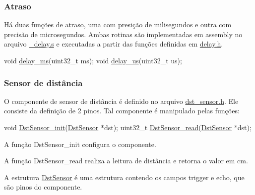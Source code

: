 \subsubsection*{Atraso}

Há duas funções de atraso, uma com presição de milisegundos e outra com precisão de microsegundos. Ambas rotinas são implementadas em assembly no arquivo {\ttfamily \mbox{\hyperlink{__delay_8s}{\+\_\+delay.\+s}}} e executadas a partir das funções definidas em {\ttfamily \mbox{\hyperlink{delay_8h}{delay.\+h}}}.


\begin{DoxyCode}
\textcolor{keywordtype}{void} \mbox{\hyperlink{delay_8c_ab7cce8122024d7ba47bf10f434956de4}{delay\_ms}}(uint32\_t ms);
\textcolor{keywordtype}{void} \mbox{\hyperlink{delay_8c_ab33ebb2c5ca2d80d259c64a9d658589f}{delay\_us}}(uint32\_t us);
\end{DoxyCode}


\subsubsection*{Sensor de distância}

O componente de sensor de distância é definido no arquivo {\ttfamily \mbox{\hyperlink{dst__sensor_8h}{dst\+\_\+sensor.\+h}}}. Ele consiste da definição de 2 pinos. Tal componente é manipulado pelas funções\+:


\begin{DoxyCode}
\textcolor{keywordtype}{void} \mbox{\hyperlink{dst__sensor_8c_a0b9337c7ac7811f15b47570565bbd914}{DstSensor\_init}}(\mbox{\hyperlink{struct_dst_sensor}{DstSensor}} *dst);
uint32\_t \mbox{\hyperlink{dst__sensor_8c_af201c139b62a0b1b36de3f03ddf4062f}{DstSensor\_read}}(\mbox{\hyperlink{struct_dst_sensor}{DstSensor}} *dst);
\end{DoxyCode}



\begin{DoxyItemize}
\item A função {\ttfamily Dst\+Sensor\+\_\+init} configura o componente.
\item A função {\ttfamily Dst\+Sensor\+\_\+read} realiza a leitura de distância e retorna o valor em cm.
\end{DoxyItemize}

A estrutura {\ttfamily \mbox{\hyperlink{struct_dst_sensor}{Dst\+Sensor}}} é uma estrutura contendo os campos {\ttfamily trigger} e {\ttfamily echo}, que são pinos do componente.

